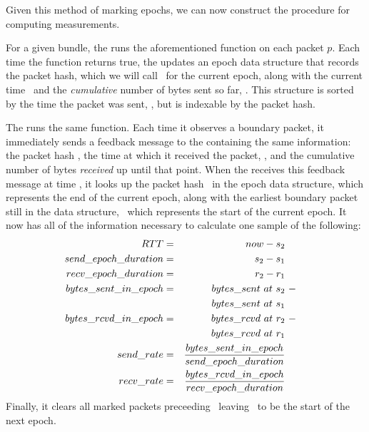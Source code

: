 Given this method of marking epochs, we can now construct the procedure for computing measurements.

For a given bundle, the \inbox runs the aforementioned function on each packet $p$. Each time
the function returns true, the \inbox updates an epoch data structure that records the packet hash,
which we will call \hptwo\ for the current epoch, 
along with the current time \stwo\ and the \emph{cumulative} number of bytes sent so far, \senttwo. This structure
is sorted by the time the packet was sent, \stwo, but is indexable by the packet hash.

The \outbox runs the same function. Each time it observes a boundary packet, 
it immediately sends a feedback message to the \inbox containing the same information:
the packet hash \hptwo, the time at which it received the packet, \rtwo, and the cumulative number of bytes
\emph{received} up until that point. When the \inbox receives this feedback message at time \atwo, it looks up the
packet hash \hptwo\ in the epoch data structure, which represents the end of the current epoch,
along with the earliest boundary packet still in the data structure, \hpone\ which represents the start
of the current epoch. It now has all of the information necessary to calculate one sample of the following:
\begin{subequations}
    \begin{align}
        RTT &= &now - s_2 \\
        send\_epoch\_duration &= &s_2 - s_1\\
        recv\_epoch\_duration &= &r_2 - r_1\\
        bytes\_sent\_in\_epoch &= &bytes\_sent\ at\ s_2 &\ - \\
                                    &&bytes\_sent\ at\ s_1&\notag\\
        bytes\_rcvd\_in\_epoch &= &bytes\_rcvd\ at\ r_2 &\ - \\
                                &&bytes\_rcvd\ at\ r_1\notag\\
        send\_rate &= &\frac{bytes\_sent\_in\_epoch}{send\_epoch\_duration}\\
        recv\_rate &= &\frac{bytes\_rcvd\_in\_epoch}{recv\_epoch\_duration}
    \end{align}
\end{subequations}
Finally, it clears all marked packets preceeding \ptwo\ leaving \ptwo\
to be the start of the next epoch.


